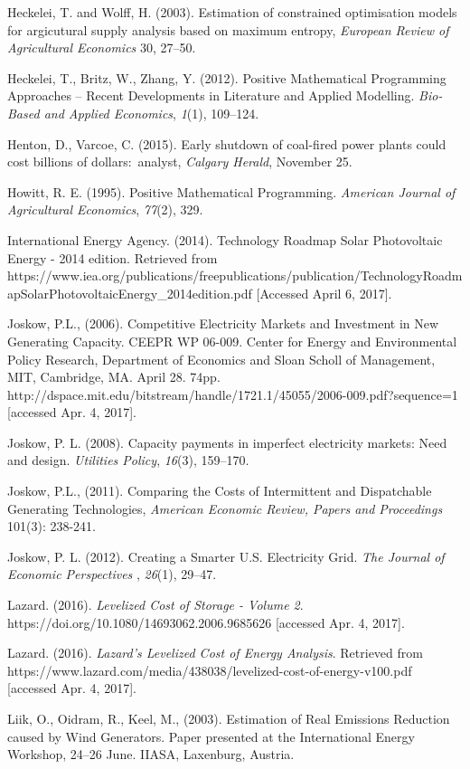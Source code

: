 Heckelei, T. and Wolff, H. (2003). Estimation of constrained
optimisation models for argicutural supply analysis based on maximum
entropy, \emph{European Review of Agricultural Economics} 30, 27--50.

Heckelei, T., Britz, W., Zhang, Y. (2012). Positive Mathematical
Programming Approaches -- Recent Developments in Literature and Applied
Modelling. \emph{Bio-Based and Applied Economics}, \emph{1}(1),
109--124.

Henton, D., Varcoe, C. (2015). Early shutdown of coal-fired power plants
could cost billions of dollars:~analyst, \emph{Calgary Herald}, November
25.

Howitt, R. E. (1995). Positive Mathematical Programming. \emph{American
Journal of Agricultural Economics}, \emph{77}(2), 329.

International Energy Agency. (2014). Technology Roadmap Solar
Photovoltaic Energy - 2014 edition. Retrieved from
https://www.iea.org/publications/freepublications/publication/TechnologyRoadmapSolarPhotovoltaicEnergy\_2014edition.pdf
{[}Accessed April 6, 2017{]}.

Joskow, P.L., (2006). Competitive Electricity Markets and Investment in
New Generating Capacity. CEEPR WP 06-009. Center for Energy and
Environmental Policy Research, Department of Economics and Sloan Scholl
of Management, MIT, Cambridge, MA. April 28. 74pp.
http://dspace.mit.edu/bitstream/handle/1721.1/45055/2006-009.pdf?sequence=1
{[}accessed Apr. 4, 2017{]}.

Joskow, P. L. (2008). Capacity payments in imperfect electricity
markets: Need and design. \emph{Utilities Policy}, \emph{16}(3),
159--170.

Joskow, P.L., (2011). Comparing the Costs of Intermittent and
Dispatchable Generating Technologies, \emph{American Economic Review,
Papers and Proceedings} 101(3): 238-241.

Joskow, P. L. (2012). Creating a Smarter U.S. Electricity Grid.
\emph{The Journal of Economic Perspectives} , \emph{26}(1), 29--47.

Lazard. (2016). \emph{Levelized Cost of Storage - Volume 2}.
https://doi.org/10.1080/14693062.2006.9685626 {[}accessed Apr. 4,
2017{]}.

Lazard. (2016). \emph{Lazard's Levelized Cost of Energy Analysis}.
Retrieved from
https://www.lazard.com/media/438038/levelized-cost-of-energy-v100.pdf
{[}accessed Apr. 4, 2017{]}.

Liik, O., Oidram, R., Keel, M., (2003). Estimation of Real Emissions
Reduction caused by Wind Generators. Paper presented at the
International Energy Workshop, 24--26 June. IIASA, Laxenburg, Austria.

